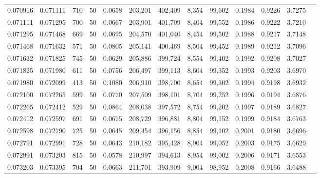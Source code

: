\begin{tabular}{rrrrrrrrrrrrr}
0.070916 & 0.071111 &   710 &  50 &                                     0.0658 & 203,201 & 402,409 &   8,354 &  99,602 & 0.1984 & 0.9226 & 3.7275 \\
0.071111 & 0.071295 &   700 &  50 &                                     0.0667 & 203,901 & 401,709 &   8,404 &  99,552 & 0.1986 & 0.9222 & 3.7210 \\
0.071295 & 0.071468 &   669 &  50 &                                     0.0695 & 204,570 & 401,040 &   8,454 &  99,502 & 0.1988 & 0.9217 & 3.7148 \\
0.071468 & 0.071632 &   571 &  50 &                                     0.0805 & 205,141 & 400,469 &   8,504 &  99,452 & 0.1989 & 0.9212 & 3.7096 \\
0.071632 & 0.071825 &   745 &  50 &                                     0.0629 & 205,886 & 399,724 &   8,554 &  99,402 & 0.1992 & 0.9208 & 3.7027 \\
0.071825 & 0.071980 &   611 &  50 &                                     0.0756 & 206,497 & 399,113 &   8,604 &  99,352 & 0.1993 & 0.9203 & 3.6970 \\
0.071980 & 0.072099 &   413 &  50 &                                     0.1080 & 206,910 & 398,700 &   8,654 &  99,302 & 0.1994 & 0.9198 & 3.6932 \\
0.072100 & 0.072265 &   599 &  50 &                                     0.0770 & 207,509 & 398,101 &   8,704 &  99,252 & 0.1996 & 0.9194 & 3.6876 \\
0.072265 & 0.072412 &   529 &  50 &                                     0.0864 & 208,038 & 397,572 &   8,754 &  99,202 & 0.1997 & 0.9189 & 3.6827 \\
0.072412 & 0.072597 &   691 &  50 &                                     0.0675 & 208,729 & 396,881 &   8,804 &  99,152 & 0.1999 & 0.9184 & 3.6763 \\
0.072598 & 0.072790 &   725 &  50 &                                     0.0645 & 209,454 & 396,156 &   8,854 &  99,102 & 0.2001 & 0.9180 & 3.6696 \\
0.072791 & 0.072991 &   728 &  50 &                                     0.0643 & 210,182 & 395,428 &   8,904 &  99,052 & 0.2003 & 0.9175 & 3.6629 \\
0.072991 & 0.073203 &   815 &  50 &                                     0.0578 & 210,997 & 394,613 &   8,954 &  99,002 & 0.2006 & 0.9171 & 3.6553 \\
0.073203 & 0.073395 &   704 &  50 &                                     0.0663 & 211,701 & 393,909 &   9,004 &  98,952 & 0.2008 & 0.9166 & 3.6488 \\

\end{tabular}
